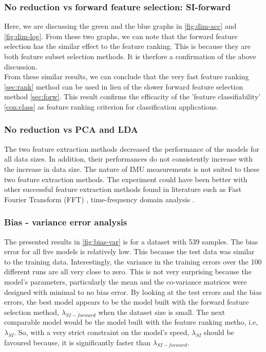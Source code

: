 \subsubsection{No reduction vs forward feature selection: SI-forward}
Here, we are discussing the green and the blue graphs in \ref{fig:dim-acc} and \ref{fig:dim-log}. From these two graphs, we can note that the forward feature selection has the similar effect to the feature ranking. This is because they are both feature subset selection methods. It is therfore a confirmation of the above discussion.\\
From these similar results, we can conclude that the very fast feature ranking \ref{sec:rank} method can be used in lieu of the slower forward feature selection method \ref{sec:forw}. This result confirms the efficacity of the 'feature classifiability' \ref{con:class} as feature ranking criterion for classification applications.

\subsubsection{No reduction vs PCA and LDA}

The two feature extraction methods decreased the performance of the models for all data sizes. In addition, their performances do not consistently increase with the increase in data size. The nature of IMU measurements is not suited to these two feature extraction methods. The experiment could have been better with other successful feature extraction methods found in literature such as Fast Fourier Transform (FFT) \cite{towa2009},
time-frequency domain analysis \cite{ches2012}.

\subsubsection{Bias - variance error analysis}
The presented results in \ref{fig:bias-var} is for a dataset with 539 samples.
The bias error for all five models is relatively low. This because the test data was similar to the training data. 
Interestingly, the variance in the training errors over the 100 different runs are all very close to zero. This is not very surprising because the model's parameters, particularly the mean and the co-variance matrices were designed with minimal to no bias error. %
By looking at the test errors and the bias errors, the best model appears to be the model built with the forward feature selection method, \(\lambda_{SI-forward}\) when the dataset size is small. The next comparable model would be the model built with the feature ranking metho, i.e, \(\lambda_{SI}\). So, with a very strict constraint on the model's speed, \(\lambda_{SI}\) should be favoured because, it is significantly faster than \(\lambda_{SI-forward}\).

